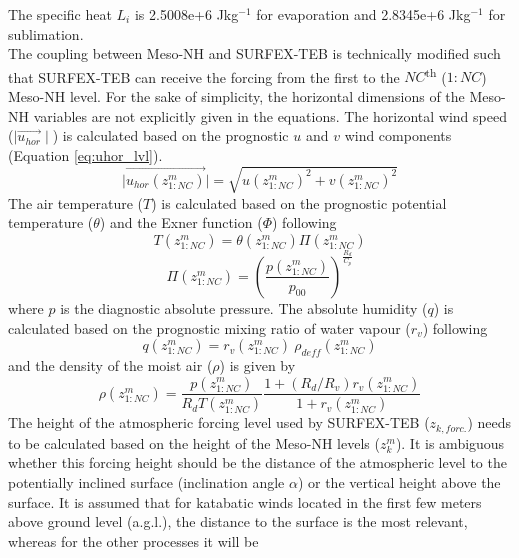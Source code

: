 The specific heat $L_{i}$ is 2.5008e+6 Jkg$^{-1}$ for evaporation and 2.8345e+6 Jkg$^{-1}$ for sublimation. \\
%
The coupling between Meso-NH and SURFEX-TEB is technically modified such that SURFEX-TEB
can receive the forcing from the first to the $NC$\textsuperscript{th} ($1:NC$) Meso-NH level.
For the sake of simplicity, the horizontal dimensions of the Meso-NH variables are not
explicitly given in the equations. The horizontal wind speed ($\mid \vec{u_{hor}} \mid$)
is calculated based on the prognostic $u$ and $v$ wind components (Equation \ref{eq:uhor_lvl}).
%
\begin{equation}
\label{eq:uhor_lvl}
\mid \vec{u_{hor}(z^{m}_{1:NC})} \mid = \sqrt{{u(z^{m}_{1:NC})}^2+{v(z^{m}_{1:NC})}^2}
\end{equation}
%
The air temperature ($T$) is calculated based on the prognostic potential temperature
($\theta$) and the Exner function ($\Phi$) following
%
\begin{equation}
\label{eq:Tair}
T(z^{m}_{1:NC}) = \theta(z^{m}_{1:NC}) \Pi(z^{m}_{1:NC})
\end{equation}
%
\begin{equation}
\label{eq:Exner}
\Pi(z^{m}_{1:NC}) = {\left( \frac{p(z^{m}_{1:NC})}{p_{00}} \right)}^{\frac{R_{d}}{C_{p}}}
\end{equation}
%
where $p$ is the diagnostic absolute pressure. 
The absolute humidity ($q$) is calculated based on the prognostic mixing ratio of water vapour ($r_v$) following
%
\begin{equation}
\label{eq:qabs}
q(z^{m}_{1:NC}) = r_v(z^{m}_{1:NC}) \ \rho_{deff}(z^{m}_{1:NC})
\end{equation}
%
and the density of the moist air ($\rho$) is given by
%
\begin{equation}
\label{eq:dens_moist}
\rho(z^{m}_{1:NC}) = \frac{p(z^{m}_{1:NC})}{R_{d} T(z^{m}_{1:NC})} \frac{1+(R_{d}/R_{v})r_v(z^{m}_{1:NC})}{1+r_v(z^{m}_{1:NC})}
\end{equation}
%
The height of the atmospheric forcing level used by SURFEX-TEB ($z_{k,forc.}$) needs to be
calculated based on the height of the Meso-NH levels ($z^{m}_{k}$). It is ambiguous whether
this forcing height should be the distance of the atmospheric level to the potentially
inclined surface (inclination angle $\alpha$) or the vertical height above the surface.
It is assumed that for katabatic winds located in the first few meters above ground level (a.g.l.),
the distance to the surface is the most relevant, whereas for the other processes it will be
